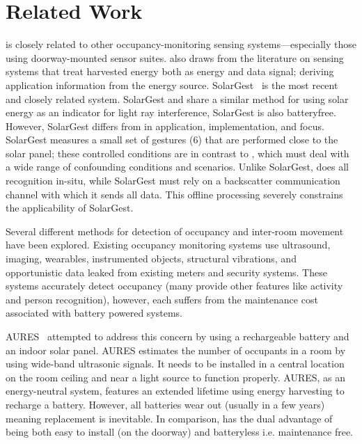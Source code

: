 \section{Related Work}
\label{sec:related}

\sysname is closely related to other occupancy-monitoring sensing systems---especially those using doorway-mounted sensor suites.
\sysname also draws from the literature on sensing systems that treat harvested energy both as energy and data signal; deriving application information from the energy source.
SolarGest~\cite{ma2019solargest} is the most recent and closely related system. SolarGest and \sysname share a similar method for using solar energy as an indicator for light ray interference, SolarGest is also batteryfree. However, SolarGest differs from \sysname in application, implementation, and focus. SolarGest measures a small set of gestures (6) that are performed close to the solar panel; these controlled conditions are in contrast to \sysname, which must deal with a wide range of confounding conditions and scenarios. Unlike SolarGest, \sysname does all recognition in-situ, while SolarGest must rely on a backscatter communication channel with which it sends all data. This offline processing severely constrains the applicability of SolarGest.


Several different methods for detection of occupancy and inter-room movement have been explored. Existing occupancy monitoring systems use ultrasound\cite{hnat2012doorjamb}, imaging\cite{tyndall2016occupancy, teixeira2007lightweight}, wearables\cite{fishkin2005hands}, instrumented objects\cite{buettner2009activity}, structural vibrations\cite{pan2016occupant}, and opportunistic data leaked from existing meters and security systems\cite{yangoccupancy2014}.
These systems accurately detect occupancy (many provide other features like activity and person recognition), however, each suffers from the maintenance cost associated with battery powered systems.

AURES~\cite{shih2016aures} attempted to address this concern by using a rechargeable battery and an indoor solar panel.
AURES estimates the number of occupants in a room by using wide-band ultrasonic signals.
It needs to be installed in a central location on the room ceiling and near a light source to function properly.
AURES, as an energy-neutral system, features an extended lifetime using energy harvesting to recharge a battery.
However, all batteries wear out (usually in a few years) meaning replacement is inevitable.
In comparison, \sysname has the dual advantage of being both easy to install (on the doorway) and batteryless i.e. maintenance free.


